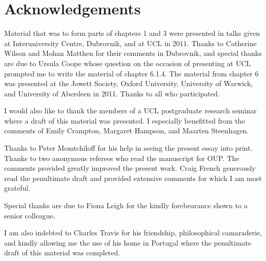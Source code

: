 \chapter*{Acknowledgements} %
\label{cha:acknowledgements}

Material that was to form parts of chapters 1 and 3 were presented in talks given at Interuniversity Centre, Dubrovnik, and at UCL in 2011. Thanks to Catherine Wilson and Mohan Matthen for their comments in Dubrovnik, and special thanks are due to Ursula Coope whose question on the occasion of presenting at UCL prompted me to write the material of chapter 6.1.4. The material from chapter 6 was presented at the Jowett Society, Oxford University, University of Warwick, and University of Aberdeen in 2011. Thanks to all who participated. 

I would also like to thank the members of a UCL postgraduate research seminar where a draft of this material was presented. I especially benefitted from the comments of Emily Crampton, Margaret Hampson, and Maarten Steenhagen.

Thanks to Peter Momtchiloff for his help in seeing the present essay into print. Thanks to two anonymous referees who read the manuscript for OUP. The comments provided greatly improved the present work. Craig French generously read the penultimate draft and provided extensive comments for which I am most grateful.

Special thanks are due to Fiona Leigh for the kindly forebearance shown to a senior colleague.

I am also indebted to Charles Travis for his friendship, philosophical camaraderie, and kindly allowing me the use of his home in Portugal where the penultimate draft of this material was completed.

